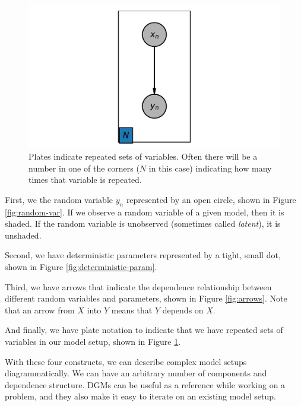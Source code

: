 \begin{figure}
    \centering
    \includegraphics[width=0.5\paperwidth]{../GraphicalModels/fig/plates.png}
    \caption{Plates indicate repeated sets of variables. Often there will be a number in one of the corners ($N$ in this case) indicating how many times that variable is repeated.}
    \label{fig:plates}
\end{figure}

First, we the random variable $y_n$ represented by an open circle, shown in Figure \ref{fig:random-var}. If we observe a random variable of a given model, then it is shaded. If the random variable is unobserved (sometimes called \textit{latent}), it is unshaded.

Second, we have deterministic parameters represented by a tight, small dot, shown in Figure \ref{fig:deterministic-param}.

Third, we have arrows that indicate the dependence relationship between different random variables and parameters, shown in Figure \ref{fig:arrows}. Note that an arrow from $X$ into $Y$ means that $Y$ depends on $X$.

And finally, we have plate notation to indicate that we have repeated sets of variables in our model setup, shown in Figure \ref{fig:plates}.

With these four constructs, we can describe complex model setups diagrammatically. We can have an arbitrary number of components and dependence structure. DGMs can be useful as a reference while working on a problem, and they also make it easy to iterate on an existing model setup.


